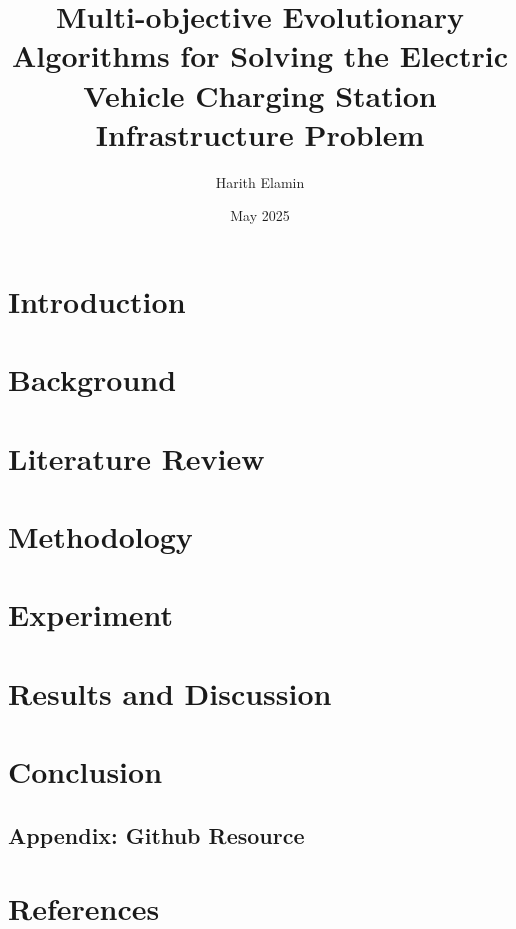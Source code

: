 \documentclass[12pt]{report}
\title{Multi-objective Evolutionary Algorithms for Solving the Electric Vehicle Charging Station Infrastructure Problem}
\author{Harith Elamin}
\date{May 2025}
\begin{document}
\maketitle

\tableofcontents
\newpage

\listoffigures
\newpage



\chapter{Introduction}


\chapter{Background}


\chapter{Literature Review}

\chapter{Methodology}


\chapter{Experiment}

\chapter{Results and Discussion}

\chapter{Conclusion}

\section*{Appendix: Github Resource}


\chapter{References}

\end{document}
